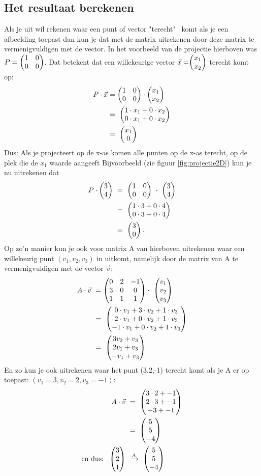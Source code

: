 \subsection{Het resultaat berekenen}
Als je uit wil rekenen waar een punt of vector "terecht" \ komt als je een afbeelding toepast dan kun je dat met de matrix uitrekenen door deze matrix te vermenigvuldigen met de vector. In het voorbeeld van de projectie hierboven was $ P = \begin{pmatrix} 1&0 \\ 0&0 \end{pmatrix} $. Dat betekent dat een willekeurige vector $ \vec{x} =  \vectweesnel{x} $  terecht komt op: 
\begin{align*}
    P\cdot \vec{x} &= \begin{pmatrix} 1&0 \\ 0&0 \end{pmatrix}   \cdot \begin{pmatrix} x_1 \\ x_2 \end{pmatrix} \\
    &= \ \begin{pmatrix} 1\cdot x_1 + 0\cdot x_2 \\ 0\cdot x_1 + 0\cdot x_2 \end{pmatrix}  \\
    & = \ \begin{pmatrix} x_1 \\ 0 \end{pmatrix}  
\end{align*}
Dus: Als je projecteert op de x-as komen alle punten  op de x-as terecht, op de plek die de $ x_1 $ waarde aangeeft Bijvoorbeeld (zie figuur \ref{fig:projectie2D}) kun je nu uitrekenen dat
\begin{align*}
    P \cdot \mattwee{3}{4}  \ &= \ \mattwee{1&0}{0&0}  \ \cdot \   \mattwee{3}{4}  \\
    &=  \ \mattwee{1\cdot 3 + 0\cdot 4}{0\cdot 3 + 0\cdot 4} \\
    &= \ \mattwee{3}{0}.  
\end{align*}
Op zo'n manier kun je ook voor  matrix A van hierboven uitrekenen waar een willekeurig punt $ (v_1, v_2, v_3)  $ in \RD uitkomt, namelijk door de matrix van A te vermenigvuldigen met de vector $ \vec{v} $:
\begin{align*}
A\cdot \vec{v} \ 
&= \matdrie{0&2&-1}{3&0&0}{1&1&1}  
\cdot  \ \matdrie{v_1}{v_2}{v_3}   \\
&= \ \matdrie{0\cdot v_1 + 3\cdot v_2 + 1\cdot v_3}{2\cdot v_1 + 0\cdot v_2+ 1\cdot v_3}{-1\cdot v_1 + 0\cdot v_2 + 1\cdot v_3}  \\
&= \ \matdrie{3v_2 + v_3}{2v_1 +  v_3}{-v_1 +  v_3} 
\end{align*}
En zo kun je ook  uitrekenen waar het punt (3,2,-1) terecht komt als je A er op toepast: $ (v_1 = 3, v_2 = 2 ,  v_3=-1 ):  $ 
\begin{align*}
\quad \ A\cdot \vec{v} \ &= \ \begin{pmatrix} 3\cdot 2 + -1 \\ 2\cdot 3+  -1 \\ -3 +  -1 \end{pmatrix} \\
    &= \  \begin{pmatrix} 5 \\ 5 \\ -4 \end{pmatrix} \\
    \text{en dus:} \ \ \begin{pmatrix} 3 \\ 2 \\ 1 \end{pmatrix}  \ & \xrightarrow{A}  \   \begin{pmatrix} 5 \\ 5 \\ -4 \end{pmatrix}
\end{align*}
